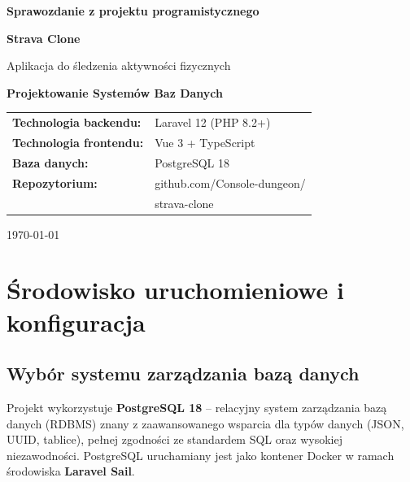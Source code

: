 \documentclass[12pt,a4paper]{report}
\begin{document}
\begin{titlepage}
    \centering
    \vspace*{2cm}

    {\LARGE\bfseries Sprawozdanie z projektu programistycznego\par}
    \vspace{1.5cm}

    {\Huge\bfseries Strava Clone\par}
    \vspace{0.5cm}
    {\large Aplikacja do śledzenia aktywności fizycznych\par}

    \vspace{1cm}
    {\large\bfseries Projektowanie Systemów Baz Danych\par}

    \vspace{1.5cm}

    \begin{tabular}{ll}
        \textbf{Technologia backendu:}  & Laravel 12 (PHP 8.2+)       \\[4pt]
        \textbf{Technologia frontendu:} & Vue 3 + TypeScript           \\[4pt]
        \textbf{Baza danych:}           & PostgreSQL 18                \\[4pt]
        \textbf{Repozytorium:}          & github.com/Console-dungeon/ \\
                                        & strava-clone                 \\
    \end{tabular}

    \vfill

    {\large \today\par}
\end{titlepage}

\tableofcontents
\thispagestyle{empty}
\cleardoublepage


\chapter{Środowisko uruchomieniowe i konfiguracja}
\label{ch:srodowisko}

\section{Wybór systemu zarządzania bazą danych}

Projekt wykorzystuje \textbf{PostgreSQL 18} -- relacyjny system zarządzania bazą danych (RDBMS) znany z zaawansowanego wsparcia dla typów danych (JSON, UUID, tablice), pełnej zgodności ze standardem SQL oraz wysokiej niezawodności. PostgreSQL uruchamiany jest jako kontener Docker w ramach środowiska \textbf{Laravel Sail}.
\end{document}

